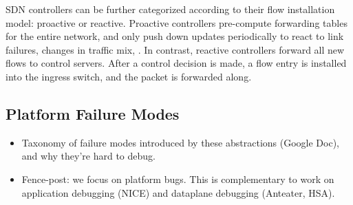 SDN controllers can be further categorized according to their flow
installation model: proactive or reactive.
Proactive controllers pre-compute forwarding tables for the entire network,
and only push down updates periodically to react to link failures, changes in
traffic mix, \etc. In contrast, reactive controllers forward all new flows to
control servers. After a control decision is made, a flow entry is installed
into the ingress switch, and the packet is forwarded along.

\subsection{Platform Failure Modes}

\begin{itemize}
\item Taxonomy of failure modes introduced by these abstractions (Google Doc),
and why they're hard to debug.
\item Fence-post: we focus on platform bugs. This is complementary to work on
application debugging (NICE) and dataplane debugging (Anteater, HSA).
\end{itemize}
